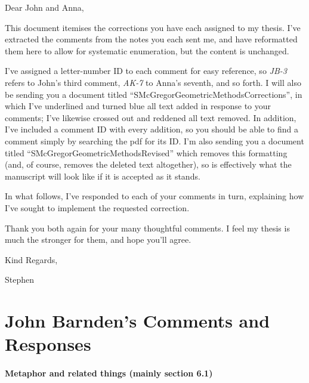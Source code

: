 \documentclass[11pt,a4paper]{article}
\begin{document}
\noindent Dear John and Anna,

\vspace{0.25cm}

\noindent This document itemises the corrections you have each assigned to my thesis.  I've extracted the comments from the notes you each sent me, and have reformatted them here to allow for systematic enumeration, but the content is unchanged.

\vspace{0.25cm}

\noindent I've assigned a letter-number ID to each comment for easy reference, so \emph{JB-3} refers to John's third comment, \emph{AK-7} to Anna's seventh, and so forth.  I will also be sending you a document titled ``SMcGregorGeometricMethodsCorrections'', in which I've underlined and turned blue all text added in response to your comments; I've likewise crossed out and reddened all text removed.  In addition, I've included a comment ID with every addition, so you should be able to find a comment simply by searching the pdf for its ID.  I'm also sending you a document titled ``SMcGregorGeometricMethodsRevised'' which removes this formatting (and, of course, removes the deleted text altogether), so is effectively what the manuscript will look like if it is accepted as it stands.

\vspace{0.25cm}

\noindent In what follows, I've responded to each of your comments in turn, explaining how I've sought to implement the requested correction.

\vspace{0.25cm}

\noindent Thank you both again for your many thoughtful comments.  I feel my thesis is much the stronger for them, and hope you'll agree.

\vspace{0.5cm}

\noindent Kind Regards,

\noindent Stephen

\section{John Barnden's Comments and Responses}

\paragraph{Metaphor and related things  (mainly section 6.1)}
\end{document}
